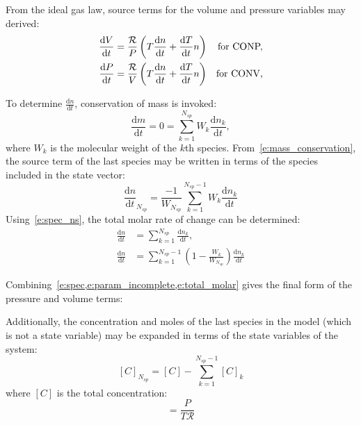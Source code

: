 \documentclass[12pt,number,sort&compress]{elsarticle}
\newcommand{\loadeq}[1]{%
   \ExecuteMetaData[eqn_dict.tex]{eq#1}%
}
\newcommand{\ns}{N_{sp}}
\newcommand{\conp}{CONP}
\newcommand{\conv}{CONV}
\newcommand{\dconp}{\ifmmode\text{for \conp,}\else for \conp,\fi}
\newcommand{\dconv}{\ifmmode\text{for \conv,}\else for \conv,\fi}
\newcommand{\Ru}{\mathcal{R}}
\begin{document}
From the ideal gas law, source terms for the volume and pressure variables may derived:
\begin{subequations}
\label{e:param_incomplete}
\begin{align}
\frac{\text{d} V }{\text{d} t } &= \frac{\Ru}{P} \left(T \frac{\text{d} n }{\text{d} t } + \frac{\text{d} T }{\text{d} t } n\right) & \text{\dconp} \\
\frac{\text{d} P }{\text{d} t } &= \frac{\Ru}{V} \left(T \frac{\text{d} n }{\text{d} t } + \frac{\text{d} T }{\text{d} t } n\right) & \text{\dconv}
\end{align}
\end{subequations}

To determine $\frac{\text{d} n }{\text{d} t }$, conservation of mass is invoked:
\begin{equation}
 \label{e:mass_conservation}
 \frac{\text{d} m }{\text{d} t } = 0 = \sum_{k=1}^{\ns}  W_{k} \frac{\text{d} n_{k} }{\text{d} t },
\end{equation}
where $W_{k}$ is the molecular weight of the $k$th species.
From~\cref{e:mass_conservation}, the source term of the last species may be written in terms of the species included in the state vector:
\begin{equation}
 \frac{\text{d} n }{\text{d} t }_{\ns} = \frac{-1}{W_{\ns}} \sum_{k=1}^{\ns - 1} W_{k} \frac{\text{d} n_{k} }{\text{d} t }
 \label{e:spec_ns}
\end{equation}
Using~\cref{e:spec_ns}, the total molar rate of change can be determined:
\begin{align}
\frac{\text{d} n }{\text{d} t } &= \sum_{k=1}^{\ns} \frac{\text{d} n_{k} }{\text{d} t }, \nonumber \\
\frac{\text{d} n }{\text{d} t } &= \sum_{k=1}^{\ns - 1} \left(1 - \frac{W_{k}}{W_{\ns}}\right) \frac{\text{d} n_{k} }{\text{d} t }
\label{e:total_molar}
\end{align}

Combining~\cref{e:spec,e:param_incomplete,e:total_molar} gives the final form of the pressure and volume terms:
\loadeq{dparam}

Additionally, the concentration and moles of the last species in the model (which is not a state variable) may be expanded in terms of the state variables of the system:
\begin{equation}
 \label{e:last_spec_conc}
   [C]_{\ns} = [C] - \sum_{k=1}^{\ns  - 1} [C]_{k}
\end{equation}
where $[C]$ is the total concentration:
\begin{equation}
 [C] = \frac{P}{T \Ru}
\end{equation}
\end{document}
